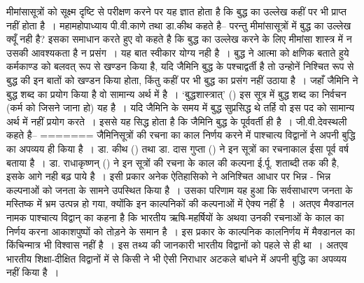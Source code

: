 मीमांसासूत्रों को सूक्ष्म दृष्टि से परीक्षण करने पर यह ज्ञात होता है कि बुद्ध का उल्लेख कहीं पर भी प्राप्त नहीं होता है~। महामहोपाध्याय पी.वी.काणे  तथा डा.कीथ कहते है–  परन्तु मीमांसासूत्रों में बुद्ध का उल्लेख क्यूँ नही है? इसका समाधान करते हुए वो कहते है कि बुद्ध का उल्लेख करने के लिए मीमांसा शास्त्र में न उसकी आवश्यकता है न प्रसंग~। यह बात स्वीकार योग्य नही है~। बुद्ध ने आत्मा को क्षणिक बताते हुये कर्मकाण्ड को बलवत् रूप से खण्डन किया है, यदि जैमिनि बुद्ध के पश्चाद्वर्ती है तो उन्होनें निश्चित रूप से बुद्ध की इन बातों को खण्डन किया होता, किंतु कहीं पर भी बुद्ध का प्रसंग नहीं उठाया है~। जहाँ जैमिनि ने बुद्ध शब्द का प्रयोग किया है वो सामान्य अर्थ में है~। ‘बुद्धशास्त्रात्' () इस सूत्र में बुद्ध शब्द का निर्वचन (कर्म को जिसने जाना हो) यह है~। यदि जैमिनि के समय में बुद्ध सुप्रसिद्ध थे तर्हि वो इस पद को सामान्य अर्थ में नहीं प्रयोग करते~। इससे यह सिद्ध होता है कि जैमिनि बुद्ध के पूर्ववर्ती ही है~। जी.वी.देवस्थली कहते है– 
=======
जैमिनिसूत्रों की रचना का काल निर्णय करने में पाश्चात्य विद्वानों ने अपनी बुद्धि का अपव्यय ही किया है~। डा. कीथ () तथा डा. दास गुप्ता () ने इन सूत्रों का रचनाकाल ईसा पूर्व  वर्ष बताया है~। डा. राधाकृष्णन् () ने इन सूत्रों की रचना के काल की कल्पना ई.र्पू. शताब्दी तक की है, इसके आगे नही बढ़ पाये है~। इसी प्रकार अनेक ऐतिहासिको ने अनिश्चित आधार पर भिन्न - भिन्न कल्पनाओं को जनता के सामने उपस्थित किया है~। उसका परिणाम यह हुआ कि सर्वसाधारण जनता के मस्तिष्क में भ्रम उत्पन्न हो गया, क्योंकि इन काल्पनिकों की कल्पनाओं में ऐक्य नहीं है~। अतएव मैक्डानल  नामक पाश्चात्य विद्वान् का कहना है कि भारतीय ऋषि-महर्षियों के अथवा उनकी रचनाओं के काल का निर्णय करना आकाशपुष्पों को तोड़ने के समान है~। इस प्रकार के काल्पनिक कालनिर्णय में मैक्डानल का किंचिन्मात्र भी विश्वास नहीं है~। इस तथ्य की जानकारी भारतीय विद्वानों को पहले से ही था~। अतएव भारतीय शिक्षा-दीक्षित विद्वानों में से किसी ने भी ऐसी निराधार अटकले बांधने में अपनी बुद्धि का अपव्यय नहीं किया है~। 

